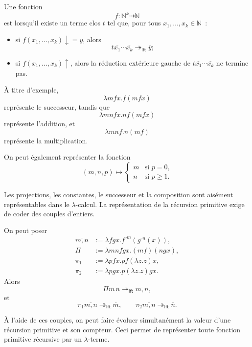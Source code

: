 \begin{defn}\label{definition-lambda-representable}
Une fonction
\[
f\colon\mathbb{N}^k\dasharrow\mathbb{N}
\]
est  lorsqu'il existe un terme clos $t$ tel que, pour tous
$x_1,\ldots,x_k\in\mathbb{N}$ :
\begin{itemize}
\item si $f(x_1,\ldots,x_k)\downarrow=y$, alors
\[
t\overline{x_1}\cdots\overline{x_k}
 \twoheadrightarrow_{\mathsf{lft}}\overline{y};
\]
\item si $f(x_1,\ldots,x_k)\uparrow$, alors la réduction extérieure
  gauche de
  $t\overline{x_1}\cdots\overline{x_k}$ ne termine pas.
\end{itemize}
\end{defn}

À titre d'exemple,
\[
\lambda mfx.f(mfx)
\]
représente le successeur, tandis que
\[
\lambda mnfx.nf(mfx)
\]
représente l'addition, et
\[
\lambda mnf.n(mf)
\]
représente la multiplication.

On peut également représenter la fonction
\[
(m,n,p)\mapsto
\begin{cases}
m&\text{si $p=0$,}\\
n&\text{si $p\geq1$.}
\end{cases}
\]

\thingy Les projections, les constantes, le successeur et la
composition sont aisément représentables dans le $\lambda$-calcul.  La
représentation de la récursion primitive exige de coder des couples
d'entiers.

On peut poser
\[
\begin{aligned}
\overline{m,n}
 &:=\lambda fgx.f^{\circ m}(g^{\circ n}(x)),\\
\Pi&:=\lambda mnfgx.(mf)(ngx),\\
\pi_1&:=\lambda pfx.pf(\lambda z.z)x,\\
\pi_2&:=\lambda pgx.p(\lambda z.z)gx.
\end{aligned}
\]
Alors
\[
\Pi\overline{m}\,\overline{n}
 \twoheadrightarrow_{\mathsf{lft}}\overline{m,n},
\]
et
\[
\pi_1\overline{m,n}
 \twoheadrightarrow_{\mathsf{lft}}\overline{m},
\qquad
\pi_2\overline{m,n}
 \twoheadrightarrow_{\mathsf{lft}}\overline{n}.
\]

À l'aide de ces couples, on peut faire évoluer simultanément la valeur
d'une récursion primitive et son compteur.  Ceci permet de représenter
toute fonction primitive récursive par un $\lambda$-terme.

